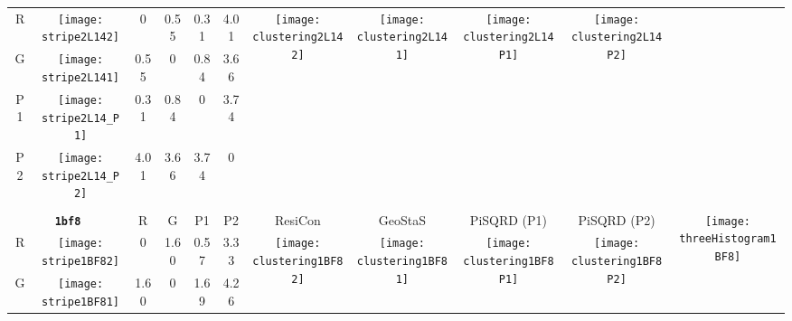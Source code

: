 \documentclass[a4paper,11pt,twoside]{book}%
\begin{document}
\begin{appendices}
\begin{sidewaystable}[h!]
\begin{tabular*}{4cm}{cc|c|c|c|c|c|c|c|c|c|}
\cline{1-10}
\multicolumn{1}{|c|}{R} & \texttt{[image: stripe2L142]} & 0 & 0.55 & 0.31 & 4.01 & \multirow{4}{*}{\vspace{-0.3cm}\texttt{[image: clustering2L142]}} & \multirow{4}{*}{\vspace{-0.3cm}\texttt{[image: clustering2L141]}} & \multirow{4}{*}{\vspace{-0.3cm}\texttt{[image: clustering2L14P1]}} & \multirow{4}{*}{\vspace{-0.3cm}\texttt{[image: clustering2L14P2]}} &  \multirow{5}{*}{} \\
\cline{1-6}
\multicolumn{1}{|c|}{G} & \texttt{[image: stripe2L141]} & 0.55 & 0 & 0.84 & 3.66 & \multirow{4}{*}{} & \multirow{4}{*}{} & \multirow{4}{*}{} & \multirow{4}{*}{} & \multirow{5}{*}{} \\
\cline{1-6}
\multicolumn{1}{|c|}{P1} & \texttt{[image: stripe2L14\_P1]} & 0.31 & 0.84 & 0 & 3.74 & \multirow{4}{*}{} & \multirow{4}{*}{} & \multirow{4}{*}{} & \multirow{4}{*}{} & \multirow{5}{*}{}  \\
\cline{1-6}
\multicolumn{1}{|c|}{P2} & \texttt{[image: stripe2L14\_P2]} & 4.01 & 3.66 & 3.74 & 0 & \multirow{4}{*}{} & \multirow{4}{*}{} & \multirow{4}{*}{} & \multirow{4}{*}{} & \multirow{5}{*}{}  \\
\cline{1-11}
\\
\cline{1-11}
\multicolumn{2}{|c|}{{\bf \texttt{1bf8}}} & R & G & P1 & P2 & ResiCon & GeoStaS & PiSQRD (P1) & PiSQRD (P2) & \multirow{5}{*}{\vspace{-0.15cm}\texttt{[image: threeHistogram1BF8]}}  \\
\cline{1-10}
\multicolumn{1}{|c|}{R} & \texttt{[image: stripe1BF82]} & 0 & 1.60 & 0.57 & 3.33 & \multirow{4}{*}{\vspace{-0.3cm}\texttt{[image: clustering1BF82]}} & \multirow{4}{*}{\vspace{-0.3cm}\texttt{[image: clustering1BF81]}} & \multirow{4}{*}{\vspace{-0.3cm}\texttt{[image: clustering1BF8P1]}} & \multirow{4}{*}{\vspace{-0.3cm}\texttt{[image: clustering1BF8P2]}} &  \multirow{5}{*}{} \\
\cline{1-6}
\multicolumn{1}{|c|}{G} & \texttt{[image: stripe1BF81]} & 1.60 & 0 & 1.69 & 4.26 & \multirow{4}{*}{} & \multirow{4}{*}{} & \multirow{4}{*}{} & \multirow{4}{*}{} & \multirow{5}{*}{} \\

\end{tabular*}
\end{sidewaystable}
\end{appendices}
\end{document}
